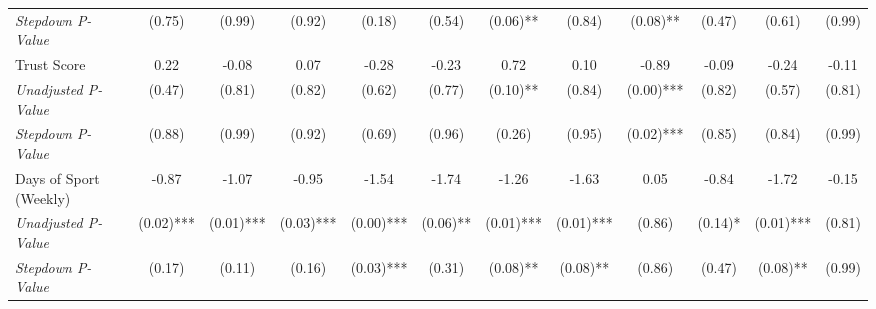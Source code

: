 \begin{tabular}{l c c c c c c c c c c c}
\quad \textit{Stepdown P-Value} & (0.75) & (0.99) & (0.92) & (0.18) & (0.54) & (0.06)** & (0.84) & (0.08)** & (0.47) & (0.61) & (0.99) \\
Trust Score & 0.22 & -0.08 & 0.07 & -0.28 & -0.23 & 0.72 & 0.10 & -0.89 & -0.09 & -0.24 & -0.11 \\
\quad \textit{Unadjusted P-Value} & (0.47) & (0.81) & (0.82) & (0.62) & (0.77) & (0.10)** & (0.84) & (0.00)*** & (0.82) & (0.57) & (0.81) \\
\quad \textit{Stepdown P-Value} & (0.88) & (0.99) & (0.92) & (0.69) & (0.96) & (0.26) & (0.95) & (0.02)*** & (0.85) & (0.84) & (0.99) \\
Days of Sport (Weekly) & -0.87 & -1.07 & -0.95 & -1.54 & -1.74 & -1.26 & -1.63 & 0.05 & -0.84 & -1.72 & -0.15 \\
\quad \textit{Unadjusted P-Value} & (0.02)*** & (0.01)*** & (0.03)*** & (0.00)*** & (0.06)** & (0.01)*** & (0.01)*** & (0.86) & (0.14)* & (0.01)*** & (0.81) \\
\quad \textit{Stepdown P-Value} & (0.17) & (0.11) & (0.16) & (0.03)*** & (0.31) & (0.08)** & (0.08)** & (0.86) & (0.47) & (0.08)** & (0.99) \\
\bottomrule
\end{tabular}
